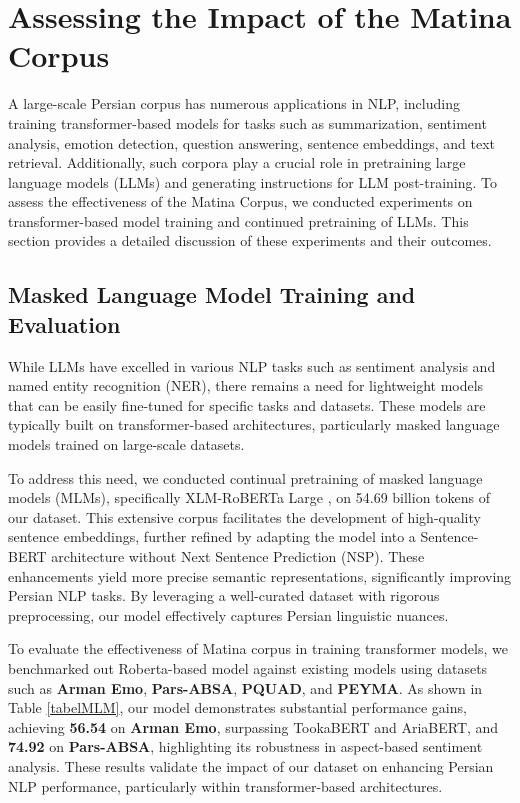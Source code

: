\section{Assessing the Impact of the Matina Corpus}

A large-scale Persian corpus has numerous applications in NLP, including training transformer-based models for tasks such as summarization, sentiment analysis, emotion detection, question answering, sentence embeddings, and text retrieval. Additionally, such corpora play a crucial role in pretraining large language models (LLMs) and generating instructions for LLM post-training. To assess the effectiveness of the Matina Corpus, we conducted experiments on transformer-based model training and continued pretraining of LLMs. This section provides a detailed discussion of these experiments and their outcomes.

\subsection{Masked Language Model Training and Evaluation}
While LLMs have excelled in various NLP tasks such as sentiment analysis and named entity recognition (NER), there remains a need for lightweight models that can be easily fine-tuned for specific tasks and datasets. These models are typically built on transformer-based architectures, particularly masked language models trained on large-scale datasets. 

To address this need, we conducted continual pretraining of masked language models (MLMs), specifically XLM-RoBERTa Large \citep{xlmro}, on 54.69 billion tokens of our dataset. This extensive corpus facilitates the development of high-quality sentence embeddings, further refined by adapting the model into a Sentence-BERT architecture without Next Sentence Prediction (NSP). These enhancements yield more precise semantic representations, significantly improving Persian NLP tasks. By leveraging a well-curated dataset with rigorous preprocessing, our model effectively captures Persian linguistic nuances. 

To evaluate the effectiveness of Matina corpus in training transformer models, we benchmarked out Roberta-based model against existing models using datasets such as \textbf{Arman Emo}, \textbf{Pars-ABSA}, \textbf{PQUAD}, and \textbf{PEYMA}. As shown in Table \ref{tabelMLM}, our model demonstrates substantial performance gains, achieving \textbf{56.54} on \textbf{Arman Emo}, surpassing TookaBERT and AriaBERT, and \textbf{74.92} on \textbf{Pars-ABSA}, highlighting its robustness in aspect-based sentiment analysis. These results validate the impact of our dataset on enhancing Persian NLP performance, particularly within transformer-based architectures.

